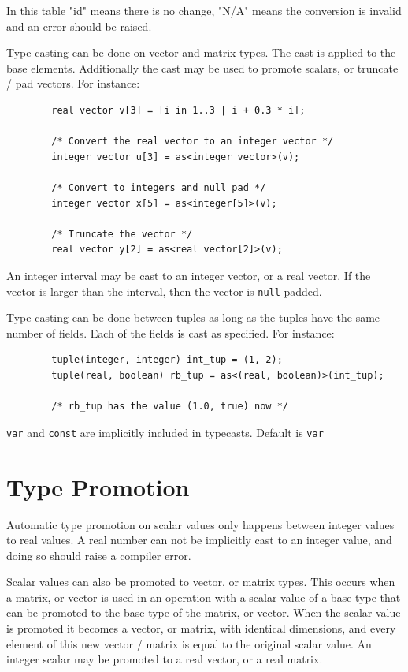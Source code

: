 \documentclass{article}
\begin{document}
	In this table "id" means there is no change, "N/A" means the conversion is invalid and an error should be raised.

	Type casting can be done on vector and matrix types. The cast is applied to the base elements. Additionally the cast
	may be used to promote scalars, or truncate / pad vectors. For instance:

	\begin{lstlisting}
		real vector v[3] = [i in 1..3 | i + 0.3 * i];

		/* Convert the real vector to an integer vector */
		integer vector u[3] = as<integer vector>(v);

		/* Convert to integers and null pad */
		integer vector x[5] = as<integer[5]>(v);

		/* Truncate the vector */
		real vector y[2] = as<real vector[2]>(v);
	\end{lstlisting}

	An integer interval may be cast to an integer vector, or a real vector. If the vector is larger than the interval,
	then the vector is \texttt{null} padded.

	Type casting can be done between tuples as long as the tuples have the same number of fields. Each of the fields is
	cast as specified. For instance:

	\begin{lstlisting}
		tuple(integer, integer) int_tup = (1, 2);
		tuple(real, boolean) rb_tup = as<(real, boolean)>(int_tup);

		/* rb_tup has the value (1.0, true) now */
	\end{lstlisting}

	\texttt{var} and \texttt{const} are implicitly included in typecasts. Default is \texttt{var}


\section{Type Promotion}\label{sec:typePromotion}

	Automatic type promotion on scalar values only happens between integer values to real values. A real number can not
	be implicitly cast to an integer value, and doing so should raise a compiler error.

	Scalar values can also be promoted to vector, or matrix types. This occurs when a matrix, or vector is used in an
	operation with a scalar value of a base type that can be promoted to the base type of the matrix, or vector. When
	the scalar value is promoted it becomes a vector, or matrix, with identical dimensions, and every element of this
	new vector / matrix is equal to the original scalar value. An integer scalar may be promoted to a real vector, or a
	real matrix.
\end{document}
